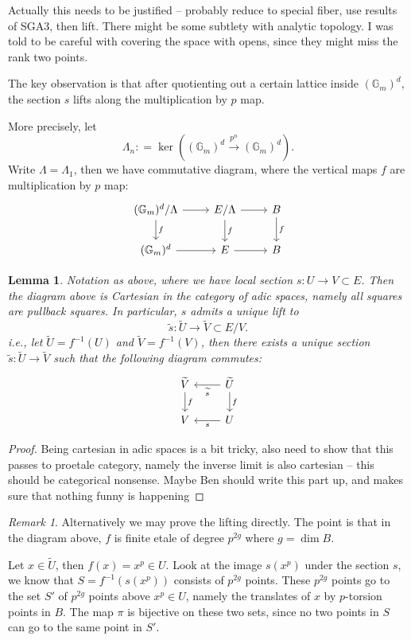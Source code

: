 \documentclass[11pt,oneside]{amsart}
\theoremstyle{theorem}
\newtheorem{lemma}[theorem]{Lemma}
\theoremstyle{definition}
\theoremstyle{remark}
\newtheorem{remark}[theorem]{Remark}
\begin{document}
{\color{red} Actually this needs to be justified -- probably reduce to special fiber, use results of SGA3, then lift. There might be some subtlety with analytic topology. I was told to be careful with covering the space with opens, since they might miss the rank two points. }

The key observation is that after quotienting out a certain lattice inside $(\mathbb G_m)^d$, the section $s$ lifts along the multiplication by $p$ map. 

More precisely, let 
$$\Lambda_n : = \ker ((\mathbb G_m)^d \xrightarrow{p^n} (\mathbb G_m)^d).$$ 
Write $\Lambda = \Lambda_1$,
then we have commutative diagram, where the vertical maps $f$ are multiplication by $p$ map: 
\[
\begin{tikzcd}
(\mathbb G_m)^d/\Lambda \arrow{r}{} \arrow{d}{f} & E/\Lambda \arrow{r}{}  \arrow{d}{f } & B  \arrow{d}{f} \\ 
(\mathbb G_m)^d  \arrow{r}{} & E \arrow{r}{} & B 
\end{tikzcd}
\]

\begin{lemma} \label{lemma:lifting}
Notation as above, where we have local section $s: U \rightarrow V \subset E$. Then the diagram above is Cartesian in the category of adic spaces, namely all squares are pullback squares. In particular, $s$ admits a unique lift to 
$$\widetilde s : \widetilde U \rightarrow \widetilde V \subset E/V.$$ 
i.e., let $\widetilde U = f^{-1} (U) $ and $\widetilde V = f^{-1} (V)$, then there exists a unique section $\widetilde s: \widetilde U \rightarrow \widetilde V$ such that the following diagram commutes:
\[
\begin{tikzcd}
 \widetilde V     \arrow{d}{f } & \widetilde U  \arrow{d}{f}  \arrow{l}{\widetilde s}\\ 
 V   & U  \arrow{l}{s}
\end{tikzcd}
\]
\end{lemma} 

\begin{proof}
{\color{red} Being cartesian in adic spaces is a bit tricky, also need to show that this passes to proetale category, namely the inverse limit is also cartesian -- this should be categorical nonsense. Maybe Ben should write this part up, and makes sure that nothing funny is happening}
\end{proof} 


\begin{remark} Alternatively we may prove the lifting directly. The point is that in the diagram above, $f$ is finite etale of degree $p^{2g}$ where $g = \dim B$. 
 
Let $x \in \widetilde U$, then $f(x) = x^p \in U$. Look at the image $s(x^p)$ under the section $s$, we know that $S= f^{-1} (s(x^p))$ consists of $p^{2g}$ points. These $p^{2g} $ points go to the set $S'$ of $p^{2g}$ points above $x^p \in U$, namely the translates of $x$ by $p$-torsion points in $B$. The map $\pi$ is bijective on these two sets, since no two points in $S$ can go to the same point in $S'$.
\end{remark}
\end{document}
